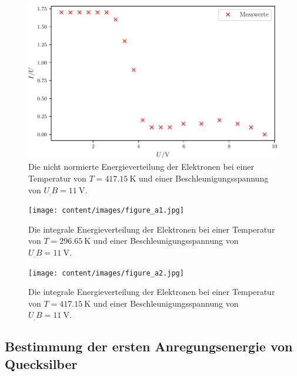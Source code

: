 \begin{figure}
\centering
\includegraphics[width=\linewidth-70pt,height=\textheight-70pt,keepaspectratio]{content/images/fig2.pdf}
\caption{Die nicht normierte Energieverteilung der Elektronen bei einer Temperatur von $T=\SI{417,15}{\kelvin}$ und einer Beschleunigungsspannung von $U_.B=\SI{11}{\volt}$.}
\label{fig:2}
\end{figure}

\begin{figure}
\centering
\texttt{[image: content/images/figure\_a1.jpg]}
\caption{Die integrale Energieverteilung der Elektronen bei einer Temperatur von $T=\SI{296,65}{\kelvin}$ und einer Beschleunigungsspannung von $U_.B=\SI{11}{\volt}$.}
\label{fig:a1}
\end{figure}

\begin{figure}
\centering
\texttt{[image: content/images/figure\_a2.jpg]}
\caption{Die integrale Energieverteilung der Elektronen bei einer Temperatur von $T=\SI{417,15}{\kelvin}$ und einer Beschleunigungsspannung von $U_.B=\SI{11}{\volt}$.}
\label{fig:a2}
\end{figure}

\begin{table}
\centering
\caption{Die Steigung $I_1/U_.{A1}$ zu $U_.{A1}$ abgelesen aus Abbildung \ref{fig:a1} und die Steigung $I_2/U_.{A2}$ zu $U_.{A2}$ abgelesen aus Abbildung \ref{fig:a2}.}

\label{tab:Energieverteilung}
\end{table}

\subsection{Bestimmung der ersten Anregungsenergie von Quecksilber}

